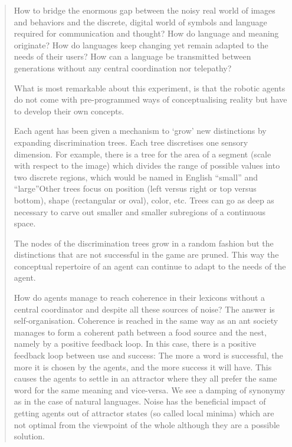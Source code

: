 \begin{quotation}
How to bridge the enormous gap between the noisy real world of images and behaviors and the discrete, digital world of symbols and language required for communication and thought? How do language and meaning originate? How do languages keep changing yet remain adapted to the needs of their users? How can a language be transmitted between generations without any central coordination nor telepathy?

What is most remarkable about this experiment, is that the robotic agents do not come with pre-programmed ways of conceptualising reality but have to develop their own concepts.

Each agent has been given a mechanism to `grow' new distinctions by expanding discrimination trees. Each tree discretises one sensory dimension. For example, there is a tree for the area of a segment (scale with respect to the image) which divides the range of possible values into two discrete regions, which would be named in English ``small'' and ``large''Other trees focus on position (left versus right or top versus bottom), shape (rectangular or oval), color, etc. Trees can go as deep as necessary to carve out smaller and smaller subregions of a continuous space.

The nodes of the discrimination trees grow in a random fashion but the distinctions that are not successful in the game are pruned. This way the conceptual repertoire of an agent can continue to adapt to the needs of the agent.

How do agents manage to reach coherence in their lexicons without a central coordinator and despite all these sources of noise? The answer is self-organisation. Coherence is reached in the same way as an ant society manages to form a coherent path between a food source and the nest, namely by a positive feedback loop. In this case, there is a positive feedback loop between use and success: The more a word is successful, the more it is chosen by the agents, and the more success it will have. This causes the agents to settle in an attractor where they all prefer the same word for the same meaning and vice-versa. We see a damping of synonymy as in the case of natural languages. Noise has the beneficial impact of getting agents out of attractor states (so called local minima) which are not optimal from the viewpoint of the whole although they are a possible solution.


\end{quotation}
